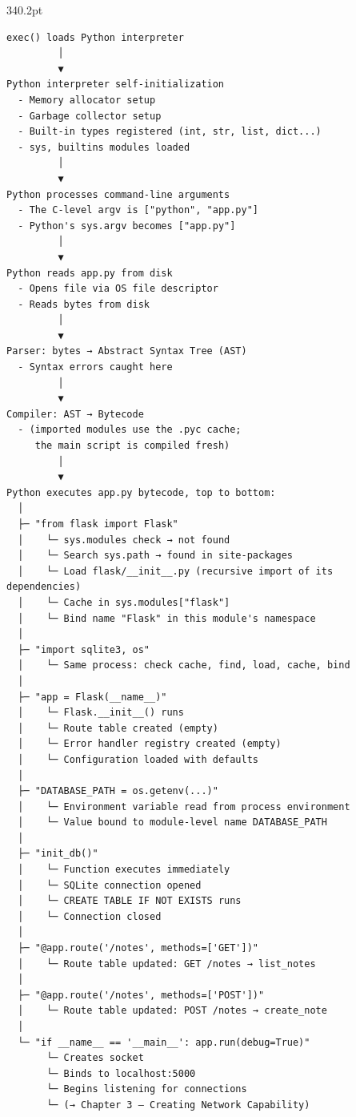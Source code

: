 \begin{diagrambox}{340.2pt}
\begin{Verbatim}[fontsize=\fontsize{9.0}{8.55}\selectfont]
exec() loads Python interpreter
         │
         ▼
Python interpreter self-initialization
  - Memory allocator setup
  - Garbage collector setup
  - Built-in types registered (int, str, list, dict...)
  - sys, builtins modules loaded
         │
         ▼
Python processes command-line arguments
  - The C-level argv is ["python", "app.py"]
  - Python's sys.argv becomes ["app.py"]
         │
         ▼
Python reads app.py from disk
  - Opens file via OS file descriptor
  - Reads bytes from disk
         │
         ▼
Parser: bytes → Abstract Syntax Tree (AST)
  - Syntax errors caught here
         │
         ▼
Compiler: AST → Bytecode
  - (imported modules use the .pyc cache;
     the main script is compiled fresh)
         │
         ▼
Python executes app.py bytecode, top to bottom:
  │
  ├─ "from flask import Flask"
  │    └─ sys.modules check → not found
  │    └─ Search sys.path → found in site-packages
  │    └─ Load flask/__init__.py (recursive import of its dependencies)
  │    └─ Cache in sys.modules["flask"]
  │    └─ Bind name "Flask" in this module's namespace
  │
  ├─ "import sqlite3, os"
  │    └─ Same process: check cache, find, load, cache, bind
  │
  ├─ "app = Flask(__name__)"
  │    └─ Flask.__init__() runs
  │    └─ Route table created (empty)
  │    └─ Error handler registry created (empty)
  │    └─ Configuration loaded with defaults
  │
  ├─ "DATABASE_PATH = os.getenv(...)"
  │    └─ Environment variable read from process environment
  │    └─ Value bound to module-level name DATABASE_PATH
  │
  ├─ "init_db()"
  │    └─ Function executes immediately
  │    └─ SQLite connection opened
  │    └─ CREATE TABLE IF NOT EXISTS runs
  │    └─ Connection closed
  │
  ├─ "@app.route('/notes', methods=['GET'])"
  │    └─ Route table updated: GET /notes → list_notes
  │
  ├─ "@app.route('/notes', methods=['POST'])"
  │    └─ Route table updated: POST /notes → create_note
  │
  └─ "if __name__ == '__main__': app.run(debug=True)"
       └─ Creates socket
       └─ Binds to localhost:5000
       └─ Begins listening for connections
       └─ (→ Chapter 3 — Creating Network Capability)
\end{Verbatim}
\end{diagrambox}

